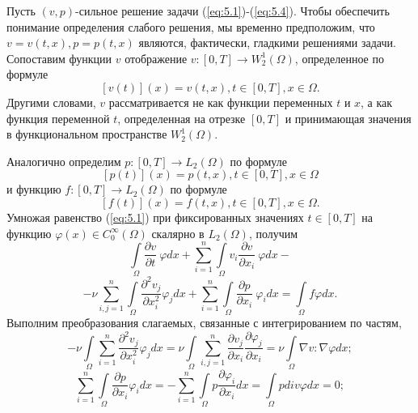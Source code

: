 Пусть $(v, p)$-сильное решение задачи (\ref{eq:5.1})-(\ref{eq:5.4}).
Чтобы обеспечить понимание определения слабого решения, мы временно предположим, что $v=v(t, x), p=p(t, x)$ являются, фактически, гладкими решениями задачи.
Сопоставим функции $v$ отображение $v:[0, T]\rightarrow W^1_2(\Omega)$, определенное по формуле $$[v(t)](x)=v(t, x), t\in[0, T], x\in\Omega.$$
Другими словами, $v$ рассматривается не как функции переменных $t$ и $x$, а как функция переменной $t$, определенная на отрезке
$[0, T]$ и принимающая значения в функциональном пространстве $W^1_2(\Omega)$.

Аналогично определим $p:[0, T]\rightarrow L_2(\Omega)$ по формуле $$[p(t)](x)=p(t, x), t\in[0, T], x\in\Omega$$
и функцию $f:[0, T]\rightarrow L_2(\Omega)$ по формуле $$[f(t)](x)=f(t, x), t\in[0, T], x\in\Omega.$$
Умножая равенство (\ref{eq:5.1}) при фиксированных значениях $t\in [0, T]$ на функцию $\varphi (x)\in C_0^{\infty}(\Omega)$ скалярно в $L_2(\Omega)$, получим
$$\int\limits_\Omega \frac{\partial v}{\partial t}\ \varphi dx+\sum_{i=1}^n\int\limits_\Omega v_i\frac{\partial v}{\partial x_i}\ \varphi dx-$$
$$-\nu \sum_{i, j=1}^n\int\limits_\Omega\frac{\partial^2 v_j}{\partial x^{2}_i} \varphi_j dx+
\sum_{i=1}^n\int\limits_\Omega \frac{\partial p}{\partial x_i}\ \varphi_idx=\int\limits_\Omega f\varphi dx.$$
Выполним преобразования слагаемых, связанные с интегрированием по частям,
$$-\nu\int\limits_\Omega \sum_{i=1}^{n}\frac{\partial^2 v_j}{\partial x^{2}_i}\varphi_j dx=
\nu\int\limits_\Omega\sum_{i, j=1}^{n}\frac{\partial v_j}{\partial x_i}\frac{\partial \varphi_j}{\partial x_i}=\nu\int\limits_\Omega \nabla v:\nabla\varphi dx;$$
$$\sum_{i=1}^{n}\int\limits_\Omega \frac{\partial p}{\partial x_i}\varphi_i dx
=-\sum_{i=1}^{n}\int\limits_\Omega p\frac{\partial \varphi_i}{\partial x_i}dx= \int\limits_\Omega p div\varphi dx=0;$$


